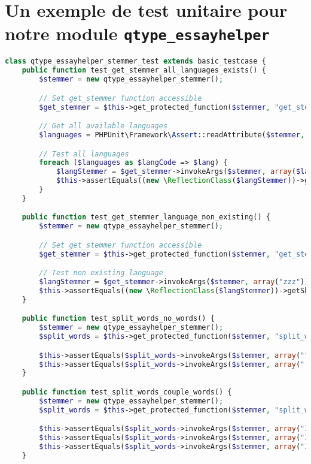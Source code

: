 \chapter{Un exemple de test unitaire pour notre module \texttt{qtype\_essayhelper}}
\label{annexe_unittest}

\begin{lstlisting}[language=php,frame=l,style=default]
class qtype_essayhelper_stemmer_test extends basic_testcase {
    public function test_get_stemmer_all_languages_exists() {
        $stemmer = new qtype_essayhelper_stemmer();

        // Set get_stemmer function accessible
        $get_stemmer = $this->get_protected_function($stemmer, "get_stemmer");

        // Get all available languages
        $languages = PHPUnit\Framework\Assert::readAttribute($stemmer, "languages");

        // Test all languages
        foreach ($languages as $langCode => $lang) {
            $langStemmer = $get_stemmer->invokeArgs($stemmer, array($langCode));
            $this->assertEquals((new \ReflectionClass($langStemmer))->getShortName(), $lang);
        }
    }

    public function test_get_stemmer_language_non_existing() {
        $stemmer = new qtype_essayhelper_stemmer();

        // Set get_stemmer function accessible
        $get_stemmer = $this->get_protected_function($stemmer, "get_stemmer");

        // Test non existing language
        $langStemmer = $get_stemmer->invokeArgs($stemmer, array("zzz"));
        $this->assertEquals((new \ReflectionClass($langStemmer))->getShortName(), "English");
    }

    public function test_split_words_no_words() {
        $stemmer = new qtype_essayhelper_stemmer();
        $split_words = $this->get_protected_function($stemmer, "split_words");

        $this->assertEquals($split_words->invokeArgs($stemmer, array("")), array());
        $this->assertEquals($split_words->invokeArgs($stemmer, array("-\n    ' %")), array());
    }

    public function test_split_words_couple_words() {
        $stemmer = new qtype_essayhelper_stemmer();
        $split_words = $this->get_protected_function($stemmer, "split_words");

        $this->assertEquals($split_words->invokeArgs($stemmer, array("I love potatoes")), array("I", "love", "potatoes"));
        $this->assertEquals($split_words->invokeArgs($stemmer, array("I+love+potatoes")), array("I", "love", "potatoes"));
        $this->assertEquals($split_words->invokeArgs($stemmer, array("I-love\npotatoes")), array("I", "love", "potatoes"));
    }


\end{lstlisting}
